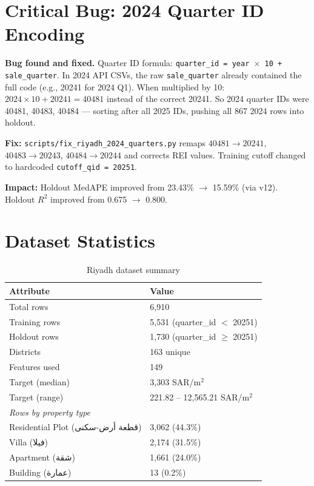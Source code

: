 \documentclass[11pt, a4paper, twoside]{report}
\begin{document}
\section{Critical Bug: 2024 Quarter ID Encoding}
\begin{tcolorbox}[colback=red!5,colframe=red!60]
  \textbf{Bug found and fixed.} Quarter ID formula: \texttt{quarter\_id = year
  $\times$ 10 + sale\_quarter}. In 2024 API CSVs, the raw
  \texttt{sale\_quarter} already contained the full code (e.g., 20241 for 2024
  Q1). When multiplied by 10: $2024 \times 10 + 20241 = 40481$ instead of the
  correct 20241. So 2024 quarter IDs were 40481, 40483, 40484 --- sorting after
  all 2025 IDs, pushing all 867 2024 rows into holdout.

  \medskip
  \textbf{Fix:} \texttt{scripts/fix\_riyadh\_2024\_quarters.py} remaps
  $40481 \to 20241$, $40483 \to 20243$, $40484 \to 20244$ and corrects REI
  values. Training cutoff changed to hardcoded \texttt{cutoff\_qid = 20251}.

  \medskip
  \textbf{Impact:} Holdout MedAPE improved from 23.43\% $\to$ 15.59\% (via v12).
  Holdout $R^2$ improved from 0.675 $\to$ 0.800.
\end{tcolorbox}

\section{Dataset Statistics}
\begin{table}[H]
  \centering
  \caption{Riyadh dataset summary}
  \begin{tabular}{ll}
    \toprule
    Attribute & Value \\
    \midrule
    Total rows      & 6,910 \\
    Training rows   & 5,531 (quarter\_id $<$ 20251) \\
    Holdout rows    & 1,730 (quarter\_id $\geq$ 20251) \\
    Districts       & 163 unique \\
    Features used   & 149 \\
    Target (median) & 3,303 SAR/m$^2$ \\
    Target (range)  & 221.82 -- 12,565.21 SAR/m$^2$ \\
    \midrule
    \multicolumn{2}{l}{\textit{Rows by property type}} \\
    Residential Plot (قطعة أرض-سكنى) & 3,062 (44.3\%) \\
    Villa (فيلا)                      & 2,174 (31.5\%) \\
    Apartment (شقة)                   & 1,661 (24.0\%) \\
    Building (عمارة)                  &    13  (0.2\%) \\
    \bottomrule
  \end{tabular}
\end{table}
\end{document}
